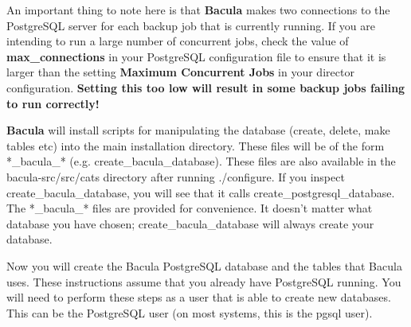 An important thing to note here is that {\bf Bacula} makes two connections
to the PostgreSQL server for each backup job that is currently running.  If
you are intending to run a large number of concurrent jobs, check the value
of {\bf max\_connections} in your PostgreSQL configuration file to ensure
that it is larger than the setting {\bf Maximum Concurrent Jobs}
in your director configuration.  {\bf Setting this too low will result in
some backup jobs failing to run correctly!}

{\bf Bacula} will install scripts for manipulating the database (create,
delete, make tables etc) into the main installation directory. These files
will be of the form *\_bacula\_* (e.g. create\_bacula\_database). These files
are also available in the \lt{}bacula-src\gt{}/src/cats directory after
running ./configure. If you inspect create\_bacula\_database, you will see
that it calls create\_postgresql\_database. The *\_bacula\_* files are
provided for convenience. It doesn't matter what database you have chosen;
create\_bacula\_database will always create your database. 

Now you will create the Bacula PostgreSQL database and the tables that Bacula
uses. These instructions assume that you already have PostgreSQL running. You
will need to perform these steps as a user that is able to create new
databases. This can be the PostgreSQL user (on most systems, this is the pgsql
user). 

